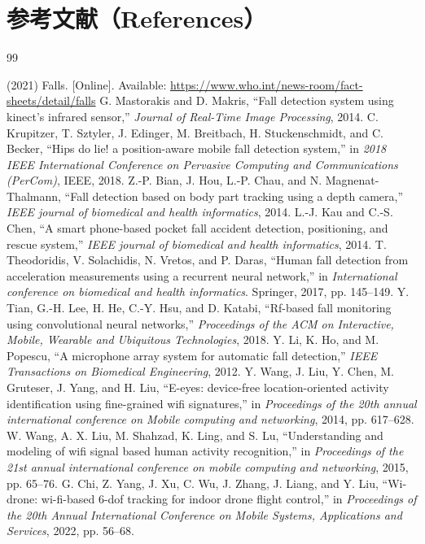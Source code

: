 \documentclass[UTF8,twocolumn]{ctexart}
\begin{document}
\section*{参考文献（References）}
\begin{thebibliography}{99}

 (2021) Falls. [Online]. Available: \url{https://www.who.int/news-room/fact-sheets/detail/falls}
 G. Mastorakis and D. Makris, “Fall detection system using kinect’s infrared sensor,” \emph{Journal of Real-Time Image Processing}, 2014.
 C. Krupitzer, T. Sztyler, J. Edinger, M. Breitbach, H. Stuckenschmidt, and C. Becker, “Hips do lie! a position-aware mobile fall detection system,” in \emph{2018 IEEE International Conference on Pervasive Computing and Communications (PerCom)}, IEEE, 2018.
 Z.-P. Bian, J. Hou, L.-P. Chau, and N. Magnenat-Thalmann, “Fall detection based on body part tracking using a depth camera,” \emph{IEEE journal of biomedical and health informatics}, 2014.
 L.-J. Kau and C.-S. Chen, “A smart phone-based pocket fall accident detection, positioning, and rescue system,” \emph{IEEE journal of biomedical and health informatics}, 2014.
 T. Theodoridis, V. Solachidis, N. Vretos, and P. Daras, “Human fall detection from acceleration measurements using a recurrent neural network,” in \emph{International conference on biomedical and health informatics}. Springer, 2017, pp. 145–149.
 Y. Tian, G.-H. Lee, H. He, C.-Y. Hsu, and D. Katabi, “Rf-based fall monitoring using convolutional neural networks,” \emph{Proceedings of the ACM on Interactive, Mobile, Wearable and Ubiquitous Technologies}, 2018.
 Y. Li, K. Ho, and M. Popescu, “A microphone array system for automatic fall detection,” \emph{IEEE Transactions on Biomedical Engineering}, 2012.
 Y. Wang, J. Liu, Y. Chen, M. Gruteser, J. Yang, and H. Liu, “E-eyes: device-free location-oriented activity identification using fine-grained wifi signatures,” in \emph{Proceedings of the 20th annual international conference on Mobile computing and networking}, 2014, pp. 617–628.
 W. Wang, A. X. Liu, M. Shahzad, K. Ling, and S. Lu, “Understanding and modeling of wifi signal based human activity recognition,” in \emph{Proceedings of the 21st annual international conference on mobile computing and networking}, 2015, pp. 65–76.
 G. Chi, Z. Yang, J. Xu, C. Wu, J. Zhang, J. Liang, and Y. Liu, “Wi-drone: wi-fi-based 6-dof tracking for indoor drone flight control,” in \emph{Proceedings of the 20th Annual International Conference on Mobile Systems, Applications and Services}, 2022, pp. 56–68.

\end{thebibliography}
\end{document}
